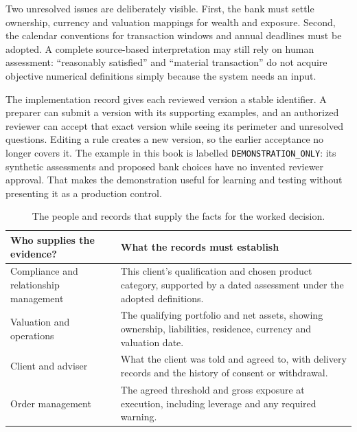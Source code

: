 Two unresolved issues are deliberately visible. First, the bank must settle
ownership, currency and valuation mappings for wealth and exposure. Second,
the calendar conventions for transaction windows and annual deadlines must be
adopted. A complete source-based interpretation may still rely on human
assessment: ``reasonably satisfied'' and ``material transaction'' do not acquire
objective numerical definitions simply because the system needs an input.

The implementation record gives each reviewed version a stable identifier. A
preparer can submit a version with its supporting examples, and an authorized
reviewer can accept that exact version while seeing its perimeter and unresolved
questions. Editing a rule creates a new version, so the earlier acceptance no
longer covers it. The example in this book is labelled
\texttt{DEMONSTRATION\_ONLY}: its synthetic assessments and proposed bank
choices have no invented reviewer approval. That makes the demonstration useful
for learning and testing without presenting it as a production control.


\begin{table}[H]
\centering
\caption{The people and records that supply the facts for the worked decision.}
\label{tab:demo-inputs-summary}
\begin{tabularx}{0.96\textwidth}{P{0.32\textwidth}Y}
\toprule
Who supplies the evidence? & What the records must establish \\ \midrule
Compliance and relationship management & This client's qualification and chosen product category, supported by a dated assessment under the adopted definitions. \\
\addlinespace[0.5em]
Valuation and operations & The qualifying portfolio and net assets, showing ownership, liabilities, residence, currency and valuation date. \\
\addlinespace[0.5em]
Client and adviser & What the client was told and agreed to, with delivery records and the history of consent or withdrawal. \\
\addlinespace[0.5em]
Order management & The agreed threshold and gross exposure at execution, including leverage and any required warning. \\
\bottomrule
\end{tabularx}
\end{table}


